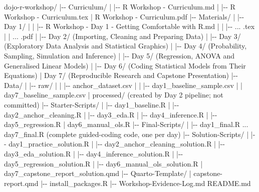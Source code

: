 \documentclass[11pt]{article}
\newenvironment{Shaded}{\begin{snugshade}}{\end{snugshade}}
\newcommand{\NormalTok}[1]{#1}
\begin{document}
\begin{Shaded}
\begin{Highlighting}[]
\NormalTok{dojo{-}r{-}workshop/}
\NormalTok{|{-}{-} Curriculum/}
\NormalTok{|   |{-}{-} R Workshop {-} Curriculum.md}
\NormalTok{|   |{-}{-} R Workshop {-} Curriculum.tex}
\NormalTok{|   \textasciigrave{}{-}{-} R Workshop {-} Curriculum.pdf}
\NormalTok{|{-}{-} Materials/}
\NormalTok{|   |{-}{-} Day 1/}
\NormalTok{|   |   |{-}{-} R Workshop {-} Day 1 {-} Getting Comfortable with R.md}
\NormalTok{|   |   |{-}{-} ... .tex}
\NormalTok{|   |   \textasciigrave{}{-}{-} ... .pdf}
\NormalTok{|   |{-}{-} Day 2/  (Importing, Cleaning and Preparing Data)}
\NormalTok{|   |{-}{-} Day 3/  (Exploratory Data Analysis and Statistical Graphics)}
\NormalTok{|   |{-}{-} Day 4/  (Probability, Sampling, Simulation and Inference)}
\NormalTok{|   |{-}{-} Day 5/  (Regression, ANOVA and Generalised Linear Models)}
\NormalTok{|   |{-}{-} Day 6/  (Coding Statistical Models from Their Equations)}
\NormalTok{|   \textasciigrave{}{-}{-} Day 7/  (Reproducible Research and Capstone Presentation)}
\NormalTok{|{-}{-} Data/}
\NormalTok{|   |{-}{-} raw/}
\NormalTok{|   |   |{-}{-} anchor\_dataset.csv}
\NormalTok{|   |   |{-}{-} day1\_baseline\_sample.csv}
\NormalTok{|   |   \textasciigrave{}{-}{-} day7\_baseline\_sample.csv}
\NormalTok{|   \textasciigrave{}{-}{-} processed/  (created by Day 2 pipeline; not committed)}
\NormalTok{|{-}{-} Starter{-}Scripts/}
\NormalTok{|   |{-}{-} day1\_baseline.R}
\NormalTok{|   |{-}{-} day2\_anchor\_cleaning.R}
\NormalTok{|   |{-}{-} day3\_eda.R}
\NormalTok{|   |{-}{-} day4\_inference.R}
\NormalTok{|   |{-}{-} day5\_regression.R}
\NormalTok{|   \textasciigrave{}{-}{-} day6\_manual\_ols.R}
\NormalTok{|{-}{-} Final{-}Scripts/}
\NormalTok{|   |{-}{-} day1\_final.R  ...  day7\_final.R  (complete guided{-}coding code, one per day)}
\NormalTok{|{-}{-} Solution{-}Scripts/}
\NormalTok{|   |{-}{-} day1\_practice\_solution.R}
\NormalTok{|   |{-}{-} day2\_anchor\_cleaning\_solution.R}
\NormalTok{|   |{-}{-} day3\_eda\_solution.R}
\NormalTok{|   |{-}{-} day4\_inference\_solution.R}
\NormalTok{|   |{-}{-} day5\_regression\_solution.R}
\NormalTok{|   |{-}{-} day6\_manual\_ols\_solution.R}
\NormalTok{|   \textasciigrave{}{-}{-} day7\_capstone\_report\_solution.qmd}
\NormalTok{|{-}{-} Quarto{-}Template/}
\NormalTok{|   \textasciigrave{}{-}{-} capstone{-}report.qmd}
\NormalTok{|{-}{-} install\_packages.R}
\NormalTok{|{-}{-} Workshop{-}Evidence{-}Log.md}
\NormalTok{\textasciigrave{}{-}{-} README.md}
\end{Highlighting}
\end{Shaded}
\end{document}
